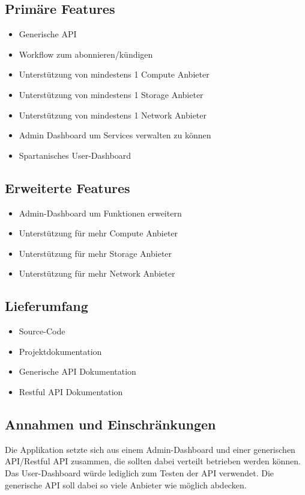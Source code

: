 \documentclass[11pt]{scrartcl}
\begin{document}
\subsection{Primäre Features}
\begin{itemize}
  \item Generische API
  \item Workflow zum abonnieren/kündigen
  \item Unterstützung von mindestens 1 Compute Anbieter
  \item Unterstützung von mindestens 1 Storage Anbieter
  \item Unterstützung von mindestens 1 Network Anbieter
  \item Admin Dashboard um Services verwalten zu können
  \item Spartanisches User-Dashboard
\end{itemize}
\subsection{Erweiterte Features}
\begin{itemize}
  \item Admin-Dashboard um Funktionen erweitern
  \item Unterstützung für mehr Compute Anbieter
  \item Unterstützung für mehr Storage Anbieter
  \item Unterstützung für mehr Network Anbieter
\end{itemize}
\subsection{Lieferumfang}
\begin{itemize}
  \item Source-Code
  \item Projektdokumentation
  \item Generische API Dokumentation
  \item Restful API Dokumentation
\end{itemize}

\subsection{Annahmen und Einschränkungen}
Die Applikation setzte sich aus einem Admin-Dashboard und einer generischen 
API/Restful API
zusammen, die sollten dabei verteilt betrieben werden können.
Das User-Dashboard würde lediglich zum Testen der API verwendet.
Die generische API soll dabei so viele Anbieter wie möglich abdecken.
\end{document}
